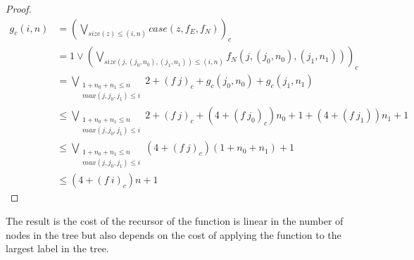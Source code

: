 \begin{proof}
\begin{align*}
  g_c(i,n) &= (\bigvee\limits_{size(z) \leq (i,n)} case(z,f_E,f_N))_c \\
           &= 1 \vee (\bigvee\limits_{size(j,(j_0,n_0),(j_1,n_1)) \leq (i,n)} f_N(j,(j_0,n_0),(j_1,n_1)))_c \\
           &= \bigvee\limits_{\substack{1 + n_0 + n_1 \leq n\\max(j,j_0,j_1)\leq i}} 2 + (f\ j)_c + g_c(j_0,n_0) + g_c(j_1,n_1) \\
           &\leq \bigvee\limits_{\substack{1 + n_0 + n_1 \leq n\\max(j,j_0,j_1)\leq i}} 2 + (f\ j)_c + (4 + (f\ j_0)_c)n_0 + 1 + (4 + (f\ j_1))n_1 + 1\\
           &\leq \bigvee\limits_{\substack{1 + n_0 + n_1 \leq n\\max(j,j_0,j_1)\leq i}} (4 + (f\ j)_c)(1 + n_0 + n_1) + 1\\
           &\leq (4 + (f\ i)_c)n + 1
\end{align*}
\end{proof}
%
The result is the cost of the recursor of the  function is linear in the
number of nodes in the tree but also depends on the cost of applying the
function to the largest label in the tree.
